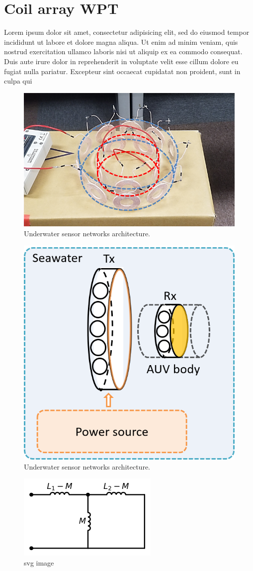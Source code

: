 \chapter{Coil array WPT}
Lorem ipsum dolor sit amet, consectetur adipisicing elit,
sed do eiusmod tempor incididunt ut labore et dolore magna aliqua.
Ut enim ad minim veniam, quis nostrud exercitation ullamco laboris nisi ut aliquip ex ea commodo consequat.
Duis aute irure dolor in reprehenderit in voluptate velit esse cillum dolore eu fugiat nulla pariatur.
Excepteur sint occaecat cupidatat non proident, sunt in culpa qui

\begin{figure}[htbp]
    \centering
    \includegraphics[width=0.7\linewidth]{images/3_coil_array_structure.png}
    \caption{Underwater sensor networks architecture.}
    \label{fig:3_coil_array_structure}
\end{figure}

\begin{figure}[htbp]
    \centering
    \includegraphics[width=0.5\linewidth]{images/3_coil_array_uwpt.png}
    \caption{Underwater sensor networks architecture.}
    \label{fig:3_coil_array_uwpt}
\end{figure}

\begin{figure}[htbp]
    \centering
    \includegraphics{images/3_mutual_inductance.png}
    \caption{svg image}
\end{figure}

